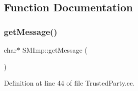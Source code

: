 \subsection{Function Documentation}
\mbox{\label{namespaceSMImp_ae98f8d04b5f3a4aab78f52b64bbb3530}} 
\subsubsection{\texorpdfstring{get\+Message()}{getMessage()}}
{\footnotesize\ttfamily char$\ast$ S\+M\+Imp\+::get\+Message (\begin{DoxyParamCaption}{ }\end{DoxyParamCaption})}



Definition at line 44 of file Trusted\+Party.\+cc.

